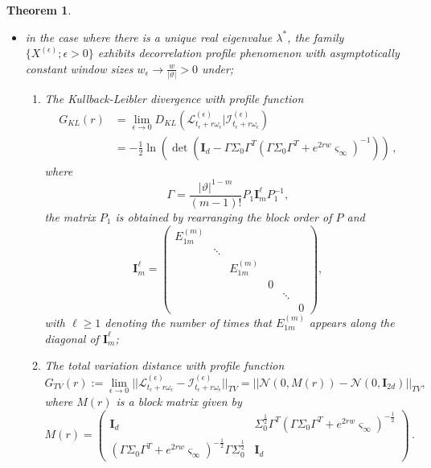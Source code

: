 \documentclass[12pt,thmsa]{article}
\newtheorem{theorem}{Theorem}
\begin{document}
\begin{theorem}
\begin{itemize}
	\item[ii)] in the case where there is a unique real eigenvalue $\lambda^*$, the family $\{X^{(\epsilon)}; \epsilon>0\}$ exhibits decorrelation profile phenomenon with  asymptotically constant window sizes $w_\epsilon\to \frac{w}{|\vartheta|}>0$ under; 
	\begin{enumerate}
		\item[a)] The Kullback-Leibler divergence with profile function
		\[
		\begin{split}
			G_{KL}(r) &= \lim_{\epsilon\to0}D_{KL}( \mathcal{L}^{(\epsilon)}_{t_\epsilon+r\omega_{\epsilon}} \Big|  \mathcal{I}^{(\epsilon)}_{t_\epsilon+r\omega_{\epsilon}} )  \\
			& =   -\frac{1}{2}\ln\left(\det\left( \mathbf{I}_d- \Gamma\Sigma_0\Gamma^T\left(\Gamma\Sigma_0\Gamma^T+ e^{2rw}\varsigma_{\infty} \right)^{-1}\right) \right)\,,
		\end{split}
		\]
		where 
		\[
		\Gamma=\frac{|\vartheta|^{1-m}}{(m-1)!} P_1\mathbf{I}^{\ell}_mP_1^{-1}, 
		\] 
		the matrix $P_1$ is obtained by rearranging the block order of $P$ and 
		\[
		\mathbf{I}^{\ell}_m=\begin{pmatrix}
			E_{1m}^{(m)}& & & & &\\ 
			&\ddots & & & &\\
			& &E_{1m}^{(m)} & & &\\
			& & & 0& & \\
			& & & &\ddots & \\
			& & & & & 0
		\end{pmatrix},
		\]
		with $\ell\geq 1$ denoting the number of times that $E_{1m}^{(m)}$ appears along the diagonal of $\mathbf{I}^{\ell}_m$;
		\item[b)] The total variation distance with profile function
		$$G_{TV}(r):=\lim_{\epsilon\to0}||\mathcal{L}^{(\epsilon)}_{t_\epsilon+r\omega_{\epsilon}}-\mathcal{I}^{(\epsilon)}_{t_\epsilon+r\omega_{\epsilon}}||_{TV} = ||\mathcal{N}(0, M(r) )-\mathcal{N}(0,\mathbf{I}_{2d} )||_{TV}, $$ 
		where $M(r)$ is a block matrix given by 
		\[
		M(r)=\begin{pmatrix}
			\mathbf{I}_d &  \Sigma_0^{\frac{1}{2}} \Gamma^T  ( \Gamma \Sigma_0 \Gamma^T + e^{2r w} \varsigma_{\infty} )^{-\frac{1}{2}} 
			\\ ( \Gamma \Sigma_0 \Gamma^T + e^{2rw} \varsigma_{\infty} )^{-\frac{1}{2}} \Gamma \Sigma_0^{\frac{1}{2}} & \mathbf{I}_d  \end{pmatrix}\,.
		\]
	\end{enumerate} 
\end{itemize}

\end{theorem}
\end{document}

